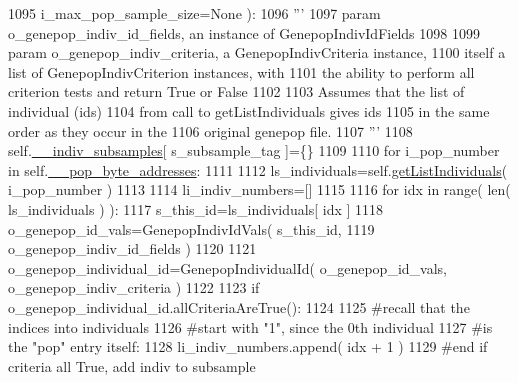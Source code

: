 \begin{DoxyCode}
1095                                             i\_max\_pop\_sample\_size=\textcolor{keywordtype}{None} ):
1096         \textcolor{stringliteral}{'''}
1097 \textcolor{stringliteral}{        param o\_genepop\_indiv\_id\_fields, an instance of GenepopIndivIdFields}
1098 \textcolor{stringliteral}{}
1099 \textcolor{stringliteral}{        param o\_genepop\_indiv\_criteria, a GenepopIndivCriteria instance,}
1100 \textcolor{stringliteral}{            itself a list of GenepopIndivCriterion instances, with}
1101 \textcolor{stringliteral}{            the ability to perform all criterion tests and return True or False}
1102 \textcolor{stringliteral}{}
1103 \textcolor{stringliteral}{        Assumes that the list of individual (ids)}
1104 \textcolor{stringliteral}{        from call to getListIndividuals gives ids}
1105 \textcolor{stringliteral}{        in the same order as they occur in the }
1106 \textcolor{stringliteral}{        original genepop file.}
1107 \textcolor{stringliteral}{        '''}
1108         self.\hyperlink{classnegui_1_1genepopfilemanager_1_1GenepopFileManager_a1e8379bcee4902ca9314ff53fcb71644}{\_\_indiv\_subsamples}[ s\_subsample\_tag ]=\{\}
1109 
1110         \textcolor{keywordflow}{for} i\_pop\_number \textcolor{keywordflow}{in} self.\hyperlink{classnegui_1_1genepopfilemanager_1_1GenepopFileManager_ae24c2bdd19136a345bdb42fd49c5d91f}{\_\_pop\_byte\_addresses}:
1111 
1112             ls\_individuals=self.\hyperlink{classnegui_1_1genepopfilemanager_1_1GenepopFileManager_aa6993dde24163002aeae55005437711d}{getListIndividuals}( i\_pop\_number )
1113 
1114             li\_indiv\_numbers=[]
1115 
1116             \textcolor{keywordflow}{for} idx \textcolor{keywordflow}{in} range( len( ls\_individuals ) ):
1117                 s\_this\_id=ls\_individuals[ idx ]
1118                 o\_genepop\_id\_vals=GenepopIndivIdVals( s\_this\_id, 
1119                                             o\_genepop\_indiv\_id\_fields )
1120 
1121                 o\_genepop\_individual\_id=GenepopIndividualId( o\_genepop\_id\_vals, o\_genepop\_indiv\_criteria )
1122                 
1123                 \textcolor{keywordflow}{if} o\_genepop\_individual\_id.allCriteriaAreTrue():
1124 
1125                     \textcolor{comment}{#recall that the indices into individuals }
1126                     \textcolor{comment}{#start with "1", since the 0th individual}
1127                     \textcolor{comment}{#is the "pop" entry itself:}
1128                     li\_indiv\_numbers.append( idx + 1 )
1129                 \textcolor{comment}{#end if criteria all True, add indiv to subsample}

\end{DoxyCode}
